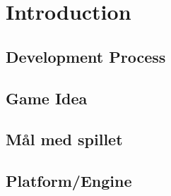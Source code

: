 \chapter{Introduction}

\section{Development Process}
\section{Game Idea}
\section{Mål med spillet}
\section{Platform/Engine}